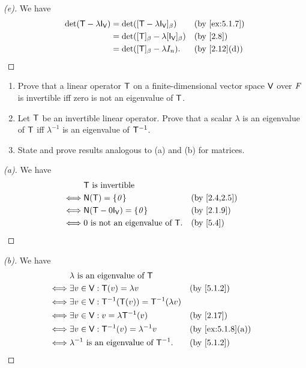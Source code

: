 \begin{proof}[(e)]
  We have
  \begin{align*}
    \det(\T - \lambda \IT[\V]) & = \det([\T - \lambda \IT[\V]]_{\beta})           &  & \text{(by \cref{ex:5.1.7})} \\
                               & = \det([\T]_{\beta} - \lambda [\IT[\V]]_{\beta}) &  & \text{(by \cref{2.8})}      \\
                               & = \det([\T]_{\beta} - \lambda I_n).              &  & \text{(by \cref{2.12}(d))}
  \end{align*}
\end{proof}

\begin{ex}\label{ex:5.1.8}
  \begin{enumerate}
    \item Prove that a linear operator \(\mathsf{T}\) on a finite-dimensional vector space \(\mathsf{V}\) over \(\mathit{F}\) is invertible iff zero is not an eigenvalue of \(\mathsf{T}\).
    \item Let \(\mathsf{T}\) be an invertible linear operator.
          Prove that a scalar \(\lambda\) is an eigenvalue of \(\mathsf{T}\) iff \(\lambda^{-1}\) is an eigenvalue of \(\mathsf{T}^{-1}\).
    \item State and prove results analogous to (a) and (b) for matrices.
  \end{enumerate}
\end{ex}

\begin{proof}[(a)]
  We have
  \begin{align*}
         & \T \text{ is invertible}                                               \\
    \iff & \ns{\T} = \set{\zv}                    &  & \text{(by \cref{2.4,2.5})} \\
    \iff & \ns{\T - 0 \IT[\V]} = \set{\zv}        &  & \text{(by \cref{2.1.9})}   \\
    \iff & 0 \text{ is not an eigenvalue of } \T. &  & \text{(by \cref{5.4})}
  \end{align*}
\end{proof}

\begin{proof}[(b)]
  We have
  \begin{align*}
         & \lambda \text{ is an eigenvalue of } \T                                                    \\
    \iff & \exists v \in \V : \T(v) = \lambda v                   &  & \text{(by \cref{5.1.2})}       \\
    \iff & \exists v \in \V : \T^{-1}(\T(v)) = \T^{-1}(\lambda v)                                     \\
    \iff & \exists v \in \V : v = \lambda \T^{-1}(v)              &  & \text{(by \cref{2.17})}        \\
    \iff & \exists v \in \V : \T^{-1}(v) = \lambda^{-1} v         &  & \text{(by \cref{ex:5.1.8}(a))} \\
    \iff & \lambda^{-1} \text{ is an eigenvalue of } \T^{-1}.     &  & \text{(by \cref{5.1.2})}
  \end{align*}
\end{proof}

